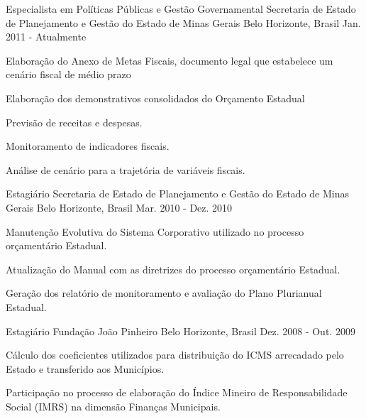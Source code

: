 \begin{cventries}
  \cventry
    {Especialista em Políticas Públicas e Gestão Governamental}
    {Secretaria de Estado de Planejamento e Gestão do Estado de Minas Gerais}
    {Belo Horizonte, Brasil}
    {Jan. 2011 - Atualmente}
    {
      \begin{cvitems}
        \item {Elaboração do Anexo de Metas Fiscais, documento legal que estabelece um cenário fiscal de médio prazo}
        \item {Elaboração dos demonstrativos consolidados do Orçamento Estadual}
        \item {Previsão de receitas e despesas.}
        \item {Monitoramento de indicadores fiscais.}
        \item {Análise de cenário para a trajetória de variáveis fiscais.}
      \end{cvitems}
    }
  \cventry
    {Estagiário}
    {Secretaria de Estado de Planejamento e Gestão do Estado de Minas Gerais}
    {Belo Horizonte, Brasil}
    {Mar. 2010 - Dez. 2010}
    {
      \begin{cvitems}
        \item {Manutenção Evolutiva do Sistema Corporativo utilizado no processo orçamentário Estadual.}
        \item {Atualização do Manual com as diretrizes do processo orçamentário Estadual.}
        \item {Geração dos relatório de monitoramento e avaliação do Plano Plurianual Estadual.}
      \end{cvitems}
    }
    \cventry
    {Estagiário}
    {Fundação João Pinheiro}
    {Belo Horizonte, Brasil}
    {Dez. 2008 - Out. 2009}
    {
      \begin{cvitems}
        \item {Cálculo dos coeficientes utilizados para distribuição do ICMS arrecadado pelo Estado e transferido aos Municípios.}
        \item {Participação no processo de elaboração do Índice Mineiro de Responsabilidade Social (IMRS) na dimensão Finanças Municipais.}
      \end{cvitems}
    }  
\end{cventries}
